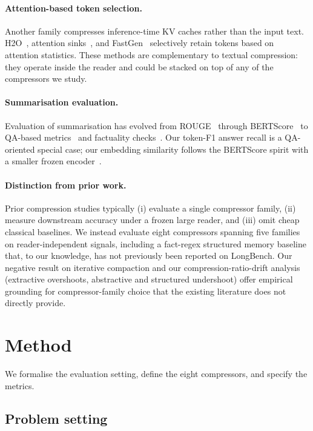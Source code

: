 \documentclass[11pt]{article}
\begin{document}
\paragraph{Attention-based token selection.}
Another family compresses inference-time KV caches rather than the
input text. H2O~\citep{zhang2023h2o}, attention
sinks~\citep{xiao2024attention}, and FastGen~\citep{ge2024fastgen}
selectively retain tokens based on attention statistics. These methods
are complementary to textual compression: they operate inside the
reader and could be stacked on top of any of the compressors we study.

\paragraph{Summarisation evaluation.}
Evaluation of summarisation has evolved from
ROUGE~\citep{lin2004rouge} through BERTScore~\citep{zhang2020bertscore}
to QA-based metrics~\citep{durmus2020feqa,deutsch2021towards} and
factuality checks~\citep{maynez2020faithfulness}. Our token-F1 answer
recall is a QA-oriented special case; our embedding similarity follows
the BERTScore spirit with a smaller frozen encoder~\citep{reimers2019sentencebert}.

\paragraph{Distinction from prior work.}
Prior compression studies typically (i) evaluate a single compressor
family, (ii) measure downstream accuracy under a frozen large reader,
and (iii) omit cheap classical baselines. We instead evaluate eight
compressors spanning five families on reader-independent signals,
including a fact-regex structured memory baseline that, to our
knowledge, has not previously been reported on LongBench. Our negative
result on iterative compaction and our compression-ratio-drift
analysis (extractive overshoots, abstractive and structured
undershoot) offer empirical grounding for compressor-family choice
that the existing literature does not directly provide.

\section{Method}
\label{sec:method}

We formalise the evaluation setting, define the eight compressors, and
specify the metrics.

\subsection{Problem setting}
\label{sec:method-setting}
\end{document}
